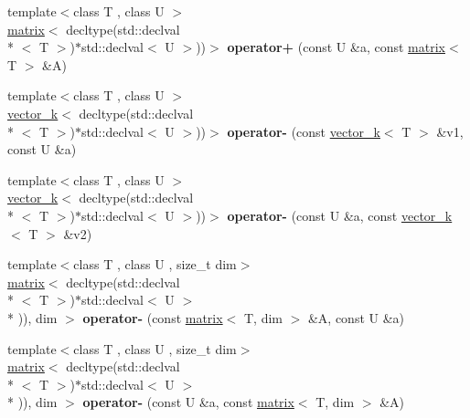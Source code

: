 \begin{DoxyCompactItemize}
\item 
\hypertarget{namespacekeycpp_a4b4a64905c9d681c174b2dfcfba272c4}{{\footnotesize template$<$class T , class U $>$ }\\\hyperlink{classkeycpp_1_1matrix}{matrix}$<$ decltype(std\-::declval\\*
$<$ T $>$)$\ast$std\-::declval$<$ U $>$))$>$ {\bfseries operator+} (const U \&a, const \hyperlink{classkeycpp_1_1matrix}{matrix}$<$ T $>$ \&A)}\label{namespacekeycpp_a4b4a64905c9d681c174b2dfcfba272c4}

\item 
\hypertarget{namespacekeycpp_a520b72efca1fbe800845b21a84d2d472}{{\footnotesize template$<$class T , class U $>$ }\\\hyperlink{classkeycpp_1_1vector__k}{vector\-\_\-k}$<$ decltype(std\-::declval\\*
$<$ T $>$)$\ast$std\-::declval$<$ U $>$))$>$ {\bfseries operator-\/} (const \hyperlink{classkeycpp_1_1vector__k}{vector\-\_\-k}$<$ T $>$ \&v1, const U \&a)}\label{namespacekeycpp_a520b72efca1fbe800845b21a84d2d472}

\item 
\hypertarget{namespacekeycpp_a1222c1fe6037feb8eacf0d2bd5152751}{{\footnotesize template$<$class T , class U $>$ }\\\hyperlink{classkeycpp_1_1vector__k}{vector\-\_\-k}$<$ decltype(std\-::declval\\*
$<$ T $>$)$\ast$std\-::declval$<$ U $>$))$>$ {\bfseries operator-\/} (const U \&a, const \hyperlink{classkeycpp_1_1vector__k}{vector\-\_\-k}$<$ T $>$ \&v2)}\label{namespacekeycpp_a1222c1fe6037feb8eacf0d2bd5152751}

\item 
\hypertarget{namespacekeycpp_af05e48a344f24985b26ddcd3584c6b3f}{{\footnotesize template$<$class T , class U , size\-\_\-t dim$>$ }\\\hyperlink{classkeycpp_1_1matrix}{matrix}$<$ decltype(std\-::declval\\*
$<$ T $>$)$\ast$std\-::declval$<$ U $>$\\*
)), dim $>$ {\bfseries operator-\/} (const \hyperlink{classkeycpp_1_1matrix}{matrix}$<$ T, dim $>$ \&A, const U \&a)}\label{namespacekeycpp_af05e48a344f24985b26ddcd3584c6b3f}

\item 
\hypertarget{namespacekeycpp_aaca75edcfed33360ce11172c32968d04}{{\footnotesize template$<$class T , class U , size\-\_\-t dim$>$ }\\\hyperlink{classkeycpp_1_1matrix}{matrix}$<$ decltype(std\-::declval\\*
$<$ T $>$)$\ast$std\-::declval$<$ U $>$\\*
)), dim $>$ {\bfseries operator-\/} (const U \&a, const \hyperlink{classkeycpp_1_1matrix}{matrix}$<$ T, dim $>$ \&A)}\label{namespacekeycpp_aaca75edcfed33360ce11172c32968d04}


\end{DoxyCompactItemize}
